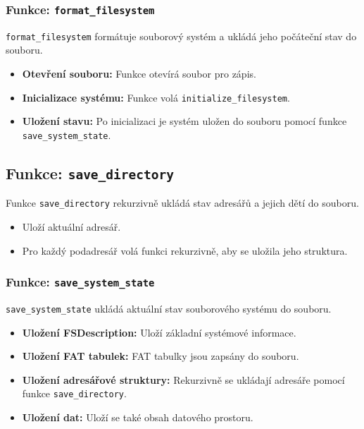 \documentclass[12pt]{article}
\begin{document}
\subsubsection*{Funkce: \texttt{format\_filesystem}}

\texttt{format\_filesystem} formátuje souborový systém a ukládá jeho počáteční stav do souboru.

\begin{itemize}
    \item \textbf{Otevření souboru:} Funkce otevírá soubor pro zápis.
    \item \textbf{Inicializace systému:} Funkce volá \texttt{initialize\_filesystem}.
    \item \textbf{Uložení stavu:} Po inicializaci je systém uložen do souboru pomocí funkce \texttt{save\_system\_state}.
\end{itemize}

\subsection*{Funkce: \texttt{save\_directory}}

Funkce \texttt{save\_directory} rekurzivně ukládá stav adresářů a jejich dětí do souboru.

\begin{itemize}
    \item Uloží aktuální adresář.
    \item Pro každý podadresář volá funkci rekurzivně, aby se uložila jeho struktura.
\end{itemize}

\subsubsection*{Funkce: \texttt{save\_system\_state}}

\texttt{save\_system\_state} ukládá aktuální stav souborového systému do souboru.

\begin{itemize}
    \item \textbf{Uložení FSDescription:} Uloží základní systémové informace.
    \item \textbf{Uložení FAT tabulek:} FAT tabulky jsou zapsány do souboru.
    \item \textbf{Uložení adresářové struktury:} Rekurzivně se ukládají adresáře pomocí funkce \texttt{save\_directory}.
    \item \textbf{Uložení dat:} Uloží se také obsah datového prostoru.
\end{itemize}
\end{document}
